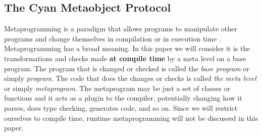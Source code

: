\documentclass[preprint,review]{elsarticle}
\newcommand{\srcstyle}[1]{\ttfamily\textbf{#1}\rmfamily}
\begin{document}
\begin{comment}
An anonymous function is a nameless function that may access local variables and fields.
\begin{verbatim}
    { (: T1 p1, T2 p2, ..., Tn pn -> R :)
         /* body */
    }
\end{verbatim}
\srcstyle{Ti}  is   the  type  of  the   parameter  \srcstyle{pi}  and
\srcstyle{R} is the optional return type. If omitted, it is deduced by
the  compiler.   An anonymous  function,  called  just
``function'', is  a literal  object.  From it  the compiler  creates a
prototype with  an \srcstyle{eval:}  method that has  the body  of the
function. This  method has  a parameter  for each  function parameter.
For  each function  a  new  prototype is  created  and this  prototype
inherits from the instantiated generic prototype:
\begin{verbatim}
    Function<T1, T2, ... Tn, R>
\end{verbatim}
\srcstyle{Function} is a  generic prototype with a  variable number of
parameters. The last one is the return type of the anonymous function.

The  value   returned  by   a  function   should  follow   the  symbol
``\srcstyle{\^}'':
\begin{verbatim}
    let f = { (: Int a, Int b :)
            ^a*b
        };
    let result = f eval: 3, 4;
    result println;
\end{verbatim}
The declaration of \srcstyle{f} and  the assignment of the function to
it  does not  execute  any code.  When  \srcstyle{f} receives  message
\srcstyle{eval:}  at runtime  the  body of  the  function is  executed
returning \srcstyle{12}. The type of \srcstyle{f} is:
\begin{verbatim}
    Function<Int, Int, Int>
\end{verbatim}

\end{comment}

\subsection{The Cyan Metaobject Protocol}

Metaprogramming is a paradigm that allows programs to manipulate other
programs and  change themselves  in compilation  or in  execution time
\cite{damavsevivcius2015taxonomy}.   Metaprogramming   has   a   broad
meaning. In this  paper we will consider it is the
transformations and  checks made  \textbf{at compile  time} by  a meta
level on a  base program. The program that is  changed or checked is
called  the {\it  base program} or simply {\it program}.  The code  that does  the changes  or
checks is called  {\it the meta level} or simply {\it metaprogram}.  The metaprogram may  be just a
set of classes  or functions and it acts as a  plugin to the
compiler, potentially changing how it parses, does type checking, generates
code, and so on.
Since we will restrict ourselves to compile time, runtime metaprogramming will
not be discussed in this paper.
\end{document}
